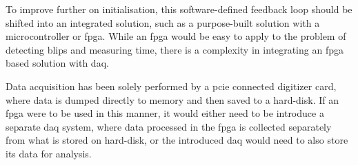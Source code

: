 To improve further on initialisation, this software-defined feedback loop should be shifted into an integrated solution, such as a purpose-built solution with a microcontroller or \gls{fpga}. While an \gls{fpga} would be easy to apply to the problem of detecting blips and measuring time, there is a complexity in integrating an \gls{fpga} based solution with \gls{daq}. 

Data acquisition has been solely performed by a \gls{pcie} connected digitizer card, where data is dumped directly to memory and then saved to a hard-disk. If an \gls{fpga} were to be used in this manner, it would either need to be introduce a separate \gls{daq} system, where data processed in the \gls{fpga} is collected separately from what is stored on hard-disk, or the introduced \gls{daq} would need to also store its data for analysis.


